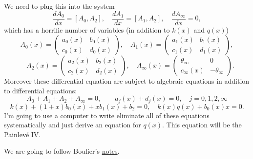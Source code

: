 \documentclass[12pt]{book}
\numberwithin{equation}{section}
\theoremstyle{definition}
\theoremstyle{remark}
\begin{document}
We need to plug this into the system 
$$ \dfrac{dA_0}{dx} = [A_0,A_2], \quad \dfrac{dA_1}{dx} = [A_1,A_2], \quad \dfrac{dA_{\infty}}{dx}=0,$$ 
which has a horrific number of variables (in addition to $k(x)$ and $q(x)$)
$$ A_0(x) = \begin{pmatrix}
a_0(x) & b_0(x) \\
c_0(x) & d_0(x)
\end{pmatrix}, \quad A_1(x) = \begin{pmatrix}
a_1(x) & b_1(x) \\
c_1(x) & d_1(x)
\end{pmatrix}, $$
$$\quad A_2(x) = \begin{pmatrix}
a_2(x) & b_2(x) \\
c_2(x) & d_2(x)
\end{pmatrix},
\quad A_{\infty}(x) = \begin{pmatrix}
\theta_{\infty} & 0\\
c_{\infty}(x) & -\theta_{\infty}
\end{pmatrix}.$$
Moreover these differential equation are subject to algebraic equations in addition to differential equations:
$$ A_0+A_1+A_2+A_{\infty}=0, \qquad a_j(x) + d_j(x)=0, \quad j=0,1,2,\infty$$
$$k(x) +(1 +x)b_0(x) + xb_1(x) + b_2=0, \quad k(x)q(x) + b_0(x)x=0.$$
I'm going to use a computer to write eliminate all of these equations systematically and just derive an equation for $q(x)$. 
This equation will be the Painlev\'e IV. 

We are going to follow Boulier's \href{https://hal.archives-ouvertes.fr/hal-00139364/document}{notes}.
\end{document}
